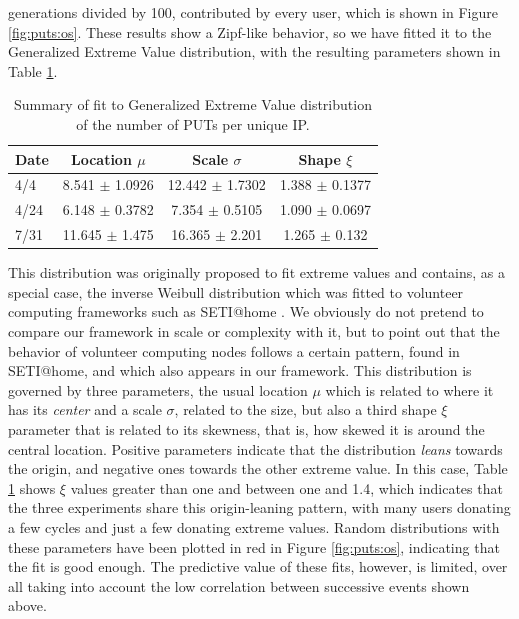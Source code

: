 \documentclass{sig-alternate}
\begin{document}
generations divided by 100, contributed by every user, which is shown
in Figure \ref{fig:puts:os}. These results show a Zipf-like behavior,
so we have fitted it to the Generalized Extreme Value distribution,
with the resulting parameters shown in Table \ref{tab:puts:os}.
%
\begin{table}
\caption{Summary of fit to Generalized Extreme Value distribution of
  the number of PUTs per unique IP. \label{tab:puts:os}}
\begin{center}
\begin{tabular}{l|ccc}
\hline
Date  & Location $\mu$ & Scale $\sigma$ & Shape $\xi$ \\
\hline
4/4 &  8.541 $\pm$ 1.0926  &    12.442 $\pm$ 1.7302 &  1.388 $\pm$
0.1377 \\
4/24 & 6.148 $\pm$ 0.3782 & 7.354 $\pm$ 0.5105 & 1.090 $\pm$  0.0697  \\
7/31 & 11.645 $\pm$ 1.475 & 16.365 $\pm$ 2.201 &  1.265 $\pm$ 0.132   \\
\hline
\end{tabular}
\end{center}
\end{table}
%
This distribution was originally proposed to fit extreme values
\cite{resnick2013extreme} and contains, as a special case, the inverse
Weibull distribution which was fitted to volunteer computing
frameworks such as SETI@home \cite{javadi2009mining}. We obviously do
not pretend to compare our framework in scale or complexity with it, but
to point out that the behavior of volunteer computing nodes follows a
certain pattern, found in SETI@home, and which also appears in our framework. This
distribution is governed by three parameters, the usual location $\mu$
which is related to where it has its {\em center} and a scale $\sigma$,
related to the size, but also a third shape $\xi$ parameter that is
related to its skewness, that is, how skewed it is around the central
location. Positive parameters indicate that the distribution {\em
  leans} towards the origin, and negative ones towards the other extreme
value. In this case, Table \ref{tab:puts:os} shows $\xi$ values
greater than one and between one and 1.4, which indicates that the
three experiments share this origin-leaning pattern, with many users
donating a few cycles and just a few donating extreme values. Random
distributions with these parameters have been plotted in red in
Figure \ref{fig:puts:os}, indicating that the fit is good enough. The
predictive value of these fits, however, is limited, over all taking
into account the low correlation between successive events shown
above.
\end{document}
